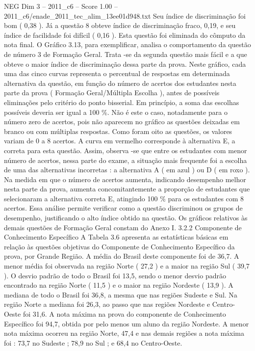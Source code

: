 \begin{textsample}{NEG Dim 3 – 2011\_c6 – Score 1.00 – 2011\_c6/enade\_2011\_tec\_alim\_13ee01d948.txt}
Seu índice de discriminação foi bom ( 0,38 ).
Já a questão 8 obteve índice de discriminação fraco, 0,19, e seu índice de facilidade foi difícil ( 0,16 ).
Esta questão foi eliminada do cômputo da nota final.
O Gráfico 3.13, para exemplificar, analisa o comportamento da questão de número 3 de Formação Geral.
Trata -se da segunda questão mais fácil e a que obteve o maior índice de discriminação dessa parte da prova.
Neste gráfico, cada uma das cinco curvas representa o percentual de respostas em determinada alternativa da questão, em função do número de acertos dos estudantes nesta parte da prova ( Formação Geral/Múltipla Escolha ), antes de possíveis eliminações pelo critério do ponto bisserial.
Em princípio, a soma das escolhas possíveis deveria ser igual a 100 \%.
Não é este o caso, notadamente para o número zero de acertos, pois não aparecem no gráfico as questões deixadas em branco ou com múltiplas respostas.
Como foram oito as questões, os valores variam de 0 a 8 acertos.
A curva em vermelho corresponde à alternativa E, a correta para esta questão.
Assim, observa -se que entre os estudantes com menor número de acertos, nessa parte do exame, a situação mais frequente foi a escolha de uma das alternativas incorretas : a alternativa A ( em azul ) ou D ( em roxo ).
Na medida em que o número de acertos aumenta, indicando desempenho melhor nesta parte da prova, aumenta concomitantemente a proporção de estudantes que selecionaram a alternativa correta E, atingindo 100 \% para os estudantes com 8 acertos.
Essa análise permite verificar como a questão discriminou os grupos de desempenho, justificando o alto índice obtido na questão.
Os gráficos relativos às demais questões de Formação Geral constam do Anexo I. 3.2.2 Componente de Conhecimento Específico A Tabela 3.6 apresenta as estatísticas básicas em relação às questões objetivas do Componente de Conhecimento Específico da prova, por Grande Região.
A média do Brasil deste componente foi de 36,7.
A menor média foi observada na região Norte ( 27,2 ) e a maior na região Sul ( 39,7 ).
O desvio padrão de todo o Brasil foi 13,5, sendo o menor desvio padrão encontrado na região Norte ( 11,5 ) e o maior na região Nordeste ( 13,9 ).
A mediana de todo o Brasil foi 36,8, a mesma que nas regiões Sudeste e Sul.
Na região Norte a mediana foi 26,3, ao passo que nas regiões Nordeste e Centro-Oeste foi 31,6.
A nota máxima na prova do componente de Conhecimento Específico foi 94,7, obtida por pelo menos um aluno da região Nordeste.
A menor nota máxima ocorreu na região Norte, 47,4 e nas demais regiões a nota máxima foi : 73,7 no Sudeste ; 78,9 no Sul ; e 68,4 no Centro-Oeste.

\end{textsample}
